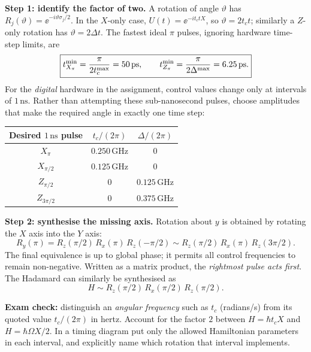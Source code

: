 \textbf{Step 1: identify the factor of two.} A rotation of angle $\vartheta$ has $R_j(\vartheta)=\ee^{-i\vartheta\sigma_j/2}$. In the $X$-only case, $U(t)=\ee^{-it_ctX}$, so $\vartheta=2t_ct$; similarly a $Z$-only rotation has $\vartheta=2\Delta t$. The fastest ideal $\pi$ pulses, ignoring hardware time-step limits, are
\begin{equation}
\boxed{t_{X_\pi}^{\rm min}=\frac\pi{2t_c^{\rm max}}=50\,\mathrm{ps},\qquad
 t_{Z_\pi}^{\rm min}=\frac\pi{2\Delta^{\rm max}}=6.25\,\mathrm{ps}.}
\end{equation}
For the \emph{digital} hardware in the assignment, control values change only at intervals of $1\,\mathrm{ns}$. Rather than attempting these sub-nanosecond pulses, choose amplitudes that make the required angle in exactly one time step:
\begin{center}\small
\begin{tabular}{@{}ccc@{}}\toprule
Desired $1\,\mathrm{ns}$ pulse&$t_c/(2\pi)$&$\Delta/(2\pi)$\\\midrule
$X_\pi$&$0.250\,\mathrm{GHz}$&$0$\\
$X_{\pi/2}$&$0.125\,\mathrm{GHz}$&$0$\\
$Z_{\pi/2}$&$0$&$0.125\,\mathrm{GHz}$\\
$Z_{3\pi/2}$&$0$&$0.375\,\mathrm{GHz}$\\\bottomrule
\end{tabular}
\end{center}
\textbf{Step 2: synthesise the missing axis.} Rotation about $y$ is obtained by rotating the $X$ axis into the $Y$ axis:
\begin{equation}
R_y(\pi)=R_z(\pi/2)\,R_x(\pi)\,R_z(-\pi/2)
\sim R_z(\pi/2)\,R_x(\pi)\,R_z(3\pi/2).
\end{equation}
The final equivalence is up to global phase; it permits all control frequencies to remain non-negative. Written as a matrix product, the \emph{rightmost pulse acts first}. The Hadamard can similarly be synthesised as
\begin{equation}
H\sim R_z(\pi/2)\,R_x(\pi/2)\,R_z(\pi/2).
\end{equation}
\begin{examtip}
\textbf{Exam check:} distinguish an \emph{angular frequency} such as $t_c$ (radians/s) from its quoted value $t_c/(2\pi)$ in hertz. Account for the factor $2$ between $H=\hbar t_cX$ and $H=\hbar\Omega X/2$. In a timing diagram put only the allowed Hamiltonian parameters in each interval, and explicitly name which rotation that interval implements.
\end{examtip}


